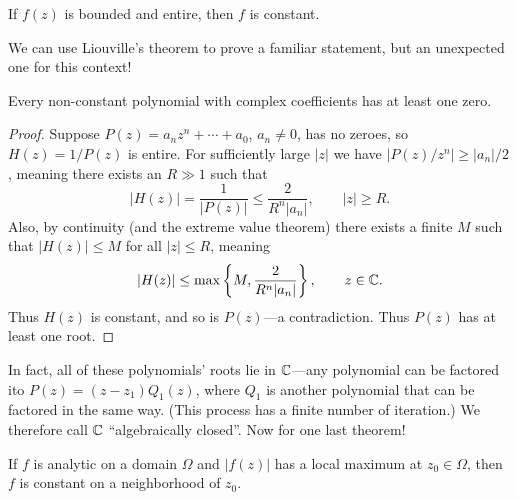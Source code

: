 \documentclass[../m136main.tex]{subfiles}
\begin{document}
\begin{theorem}
    If $f(z)$ is bounded and entire, then $f$ is constant.
\end{theorem}

We can use Liouville's theorem to prove a familiar statement, but an unexpected one for this context!

\begin{theorem}
    Every non-constant polynomial with complex coefficients has at least one zero.
\end{theorem}

\begin{proof}
    Suppose $P(z) = a_n z^n + \cdots + a_0$, $a_n \neq 0$, has no zeroes, so $H(z) = 1 / P(z)$ is entire.
    For sufficiently large $|z|$ we have $|P(z) / z^n| \geq |a_n| / 2$, meaning there exists an $R \gg 1$ such that
    \[ |H(z)| = \frac{1}{|P(z)|} \leq \frac{2}{R^n |a_n|}, \qquad |z| \geq R. \]
    Also, by continuity (and the extreme value theorem) there exists a finite $M$ such that $|H(z)| \leq M$ for all $|z| \leq R$, meaning
    \[ |H(z)| \leq \max \left\{ M, \frac{2}{R^n |a_n|} \right\}, \qquad z \in \mathbb{C}. \]
    Thus $H(z)$ is constant, and so is $P(z)$---a contradiction.
    Thus $P(z)$ has at least one root.
\end{proof}

In fact, all of these polynomials' roots lie in $\mathbb{C}$---any polynomial can be factored ito $P(z) = (z - z_1) Q_1(z)$, where $Q_1$ is another polynomial that can be factored in the same way.
(This process has a finite number of iteration.)
We therefore call $\mathbb{C}$ ``algebraically closed''.
Now for one last theorem!

\begin{theorem}
    If $f$ is analytic on a domain $\Omega$ and $|f(z)|$ has a local maximum at $z_0 \in \Omega$, then $f$ is constant on a neighborhood of $z_0$.
\end{theorem}
\end{document}
